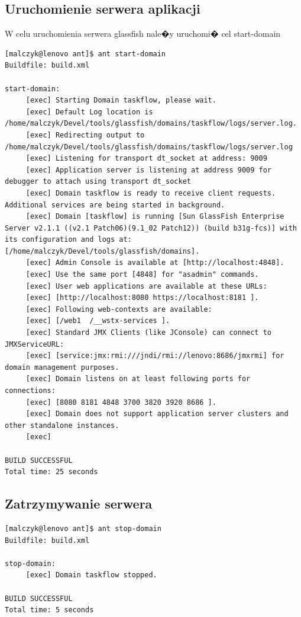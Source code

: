 \documentclass{article}
\begin{document}
\subsection{Uruchomienie serwera aplikacji}
W celu uruchomienia serwera glassfish nale�y uruchomi� cel start-domain
{\tiny

\begin{verbatim}
[malczyk@lenovo ant]$ ant start-domain
Buildfile: build.xml

start-domain:
     [exec] Starting Domain taskflow, please wait.
     [exec] Default Log location is /home/malczyk/Devel/tools/glassfish/domains/taskflow/logs/server.log.
     [exec] Redirecting output to /home/malczyk/Devel/tools/glassfish/domains/taskflow/logs/server.log
     [exec] Listening for transport dt_socket at address: 9009
     [exec] Application server is listening at address 9009 for debugger to attach using transport dt_socket
     [exec] Domain taskflow is ready to receive client requests. Additional services are being started in background. 
     [exec] Domain [taskflow] is running [Sun GlassFish Enterprise Server v2.1.1 ((v2.1 Patch06)(9.1_02 Patch12)) (build b31g-fcs)] with its configuration and logs at: [/home/malczyk/Devel/tools/glassfish/domains].
     [exec] Admin Console is available at [http://localhost:4848].
     [exec] Use the same port [4848] for "asadmin" commands.
     [exec] User web applications are available at these URLs:
     [exec] [http://localhost:8080 https://localhost:8181 ].
     [exec] Following web-contexts are available:
     [exec] [/web1  /__wstx-services ].
     [exec] Standard JMX Clients (like JConsole) can connect to JMXServiceURL:
     [exec] [service:jmx:rmi:///jndi/rmi://lenovo:8686/jmxrmi] for domain management purposes.
     [exec] Domain listens on at least following ports for connections:
     [exec] [8080 8181 4848 3700 3820 3920 8686 ].
     [exec] Domain does not support application server clusters and other standalone instances.
     [exec] 

BUILD SUCCESSFUL
Total time: 25 seconds
\end{verbatim}
}

\subsection{Zatrzymywanie serwera}
{\tiny
\begin{verbatim}
[malczyk@lenovo ant]$ ant stop-domain
Buildfile: build.xml

stop-domain:
     [exec] Domain taskflow stopped.

BUILD SUCCESSFUL
Total time: 5 seconds

\end{verbatim}
}
\end{document}
